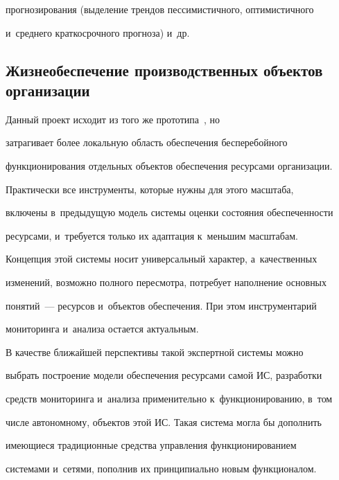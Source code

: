 прогнозирования (выделение трендов пессимистичного, оптимистичного 

и~среднего краткосрочного прогноза) и~др.



\vspace*{-3pt}

     

\subsection{Жизнеобеспечение производственных объектов организации}



\vspace*{-3pt}

     

     Данный проект исходит из того же прототипа~\cite{15-zh}, но 

затрагивает более локальную область обеспечения бесперебойного 

функционирования отдельных объектов обеспечения ресурсами организации. 

Практически все инструменты, которые нужны для этого масштаба, 

включены в~предыдущую модель системы оценки состояния обеспеченности 

ресурсами, и~требуется только их адаптация к~меньшим масштабам. 

Концепция этой системы носит универсальный характер, а~качественных 

изменений, возможно полного пересмотра, потребует наполнение основных 

понятий~--- ресурсов и~объектов обеспечения. При этом инструментарий 

мониторинга и~анализа остается актуальным.

     

     В качестве ближайшей перспективы такой экспертной системы можно 

выбрать построение модели обеспечения ресурсами самой ИС, разработки 

средств мониторинга и~анализа применительно к~функционированию, в~том 

числе автономному, объектов этой ИС. Такая система могла бы дополнить 

имеющиеся традиционные средства управления функционированием 

системами и~сетями, пополнив их принципиально новым функционалом.



